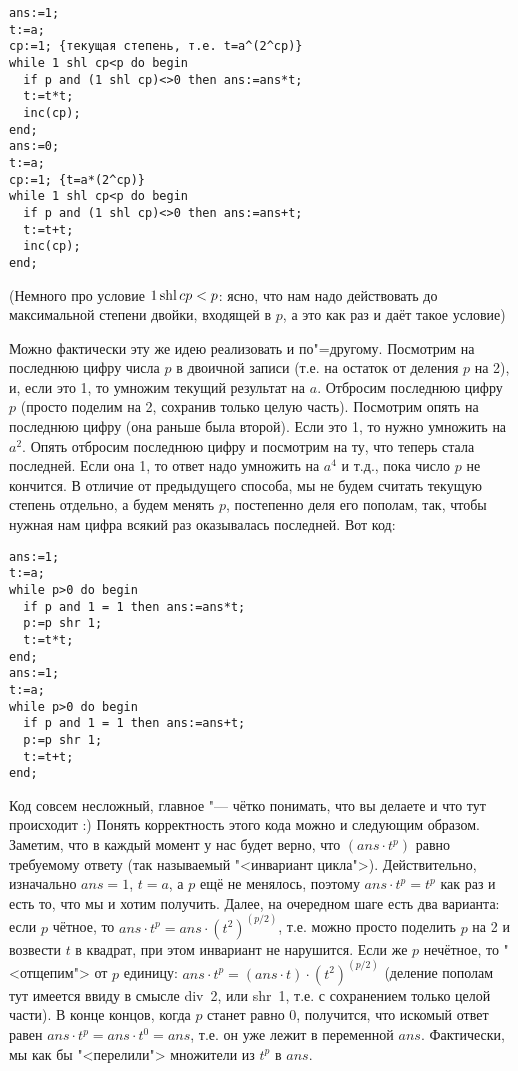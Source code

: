 \begin{codesample}\begin{verbatim}
ans:=1;
t:=a;
cp:=1; {текущая степень, т.е. t=a^(2^cp)}
while 1 shl cp<p do begin
  if p and (1 shl cp)<>0 then ans:=ans*t;
  t:=t*t;
  inc(cp);
end;
ans:=0;
t:=a;
cp:=1; {t=a*(2^cp)}
while 1 shl cp<p do begin
  if p and (1 shl cp)<>0 then ans:=ans+t;
  t:=t+t;
  inc(cp);
end;
\end{verbatim}\end{codesample}
(Немного про условие $1 \mathop{\mathrm{shl}} cp<p$: ясно, что нам надо действовать до максимальной степени двойки, 
входящей в $p$, а это как раз и даёт такое условие)

Можно фактически эту же идею реализовать и по"=другому. 
Посмотрим на последнюю цифру числа $p$ в двоичной записи (т.е. на остаток от деления $p$ на 2), 
и, если это 1, то умножим текущий результат на $a$. Отбросим последнюю цифру $p$
(просто поделим на 2, сохранив только целую часть). Посмотрим опять на последнюю цифру (она раньше была второй). 
Если это 1, то нужно умножить на $a^2$. 
Опять отбросим последнюю цифру и посмотрим на ту, что теперь стала последней. Если она 1, то 
ответ надо умножить на $a^4$ и т.д., пока число $p$ не кончится. В отличие от предыдущего способа, 
мы не будем считать текущую степень отдельно, а будем менять $p$, постепенно деля его пополам, так, 
чтобы нужная нам цифра всякий раз оказывалась последней.
Вот код:

\begin{codesample}\begin{verbatim}
ans:=1;
t:=a;
while p>0 do begin
  if p and 1 = 1 then ans:=ans*t;
  p:=p shr 1;
  t:=t*t;
end;
ans:=1;
t:=a;
while p>0 do begin
  if p and 1 = 1 then ans:=ans+t;
  p:=p shr 1;
  t:=t+t;
end;
\end{verbatim}\end{codesample}

Код совсем несложный, главное "--- чётко понимать, что вы делаете и что тут происходит :) 
Понять корректность этого кода можно и следующим образом. Заметим, что в каждый 
момент у нас будет верно, что $(ans\cdot t^p)$ равно требуемому ответу (так называемый 
"<инвариант цикла">). Действительно, изначально $ans=1$, 
$t=a$, а $p$ ещё не менялось, поэтому $ans\cdot t^p=t^p$ как раз и есть то, что мы и хотим 
получить. Далее, на очередном шаге есть два варианта: если $p$ чётное, то 
$ans\cdot t^p=ans\cdot (t^2)^{(p/2)}$, т.е. можно просто поделить $p$ на 2 и возвести $t$ в квадрат, при 
этом инвариант не нарушится. Если же $p$ нечётное, то "<отщепим"> от $p$ единицу: 
$ans\cdot t^p=(ans\cdot t)\cdot (t^2)^{(p/2)}$ (деление пополам тут имеется ввиду в смысле 
div~2, или shr~1, т.е. с сохранением только целой части). В конце концов, когда $p$ станет равно 0, получится, что 
искомый ответ равен $ans\cdot t^p=ans\cdot t^0=ans$, т.е. он уже лежит в переменной $ans$. 
Фактически, мы как бы "<перелили"> множители из $t^p$ в $ans$.

